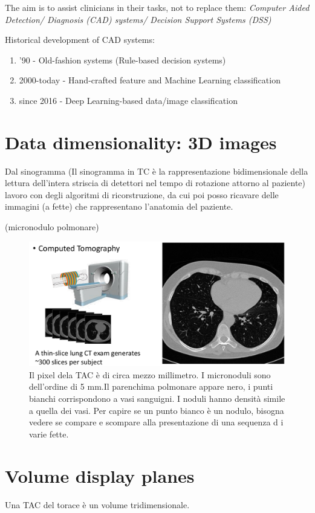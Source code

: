 The aim is to assist clinicians in their tasks,
not to replace them: \textit{Computer Aided Detection/ Diagnosis (CAD) systems/ Decision Support Systems (DSS)}

Historical development of CAD systems:
\begin{enumerate}
	\item ’90 - Old-fashion systems (Rule-based decision systems)
	\item 2000-today - Hand-crafted feature and Machine Learning classification
	\item since 2016 - Deep Learning-based data/image classification
\end{enumerate}


\section{Data dimensionality: 3D images}

Dal sinogramma (Il sinogramma in TC è la rappresentazione bidimensionale della lettura dell'intera striscia di detettori nel tempo di rotazione attorno al paziente) lavoro con degli algoritmi di ricorstruzione, da cui poi posso ricavare delle immagini (a fette) che rappresentano l'anatomia del paziente.

(micronodulo polmonare)\\


\begin{figure}[ht]
	\centering
	\includegraphics[width=0.7\linewidth]{figure_med/datadim3d}
	\caption{Il pixel dela TAC è di circa mezzo millimetro. I micronoduli sono dell'ordine di 5 mm.Il parenchima polmonare appare nero, i punti bianchi corrispondono a vasi sanguigni. I noduli hanno densità simile a quella dei vasi. Per capire se un punto bianco è un nodulo, bisogna vedere se compare e scompare alla presentazione di una sequenza d i varie fette.}
\end{figure}
\FloatBarrier

\section{Volume display planes}
Una TAC del torace è un volume tridimensionale.\\

